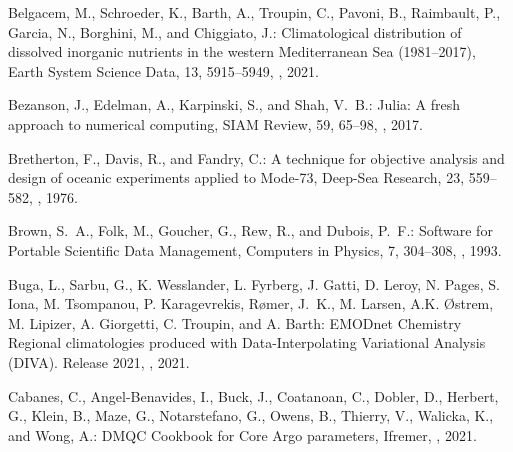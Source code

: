 \documentclass[essd,manuscript]{copernicus}
\begin{document}
\begin{thebibliography}{52}
Belgacem, M., Schroeder, K., Barth, A., Troupin, C., Pavoni, B., Raimbault, P.,
  Garcia, N., Borghini, M., and Chiggiato, J.: {Climatological distribution of
  dissolved inorganic nutrients in the western Mediterranean Sea
  (1981–2017)}, Earth System Science Data, 13, 5915–5949,
  , 2021.

Bezanson, J., Edelman, A., Karpinski, S., and Shah, V.~B.: Julia: A fresh
  approach to numerical computing, SIAM {R}eview, 59, 65--98,
  , 2017.

Bretherton, F., Davis, R., and Fandry, C.: {A technique for objective analysis
  and design of oceanic experiments applied to Mode-73}, Deep-Sea Research, 23,
  559--582, , 1976.

Brown, S.~A., Folk, M., Goucher, G., Rew, R., and Dubois, P.~F.: {Software for
  Portable Scientific Data Management}, Computers in Physics, 7, 304–308,
  , 1993.

Buga, L., Sarbu, G., {K. Wesslander}, {L. Fyrberg}, {J. Gatti}, {D. Leroy}, {N.
  Pages}, {S. Iona}, {M. Tsompanou}, {P. Karagevrekis}, Rømer, J.~K., {M.
  Larsen}, {A.K. Østrem}, {M. Lipizer}, {A. Giorgetti}, {C. Troupin}, and {A.
  Barth}: {EMODnet Chemistry Regional climatologies produced with
  Data-Interpolating Variational Analysis (DIVA). Release 2021},
  , 2021.

Cabanes, C., Angel-Benavides, I., Buck, J., Coatanoan, C., Dobler, D., Herbert,
  G., Klein, B., Maze, G., Notarstefano, G., Owens, B., Thierry, V., Walicka,
  K., and Wong, A.: DMQC Cookbook for Core Argo parameters, Ifremer,
  , 2021.


\end{thebibliography}
\end{document}

